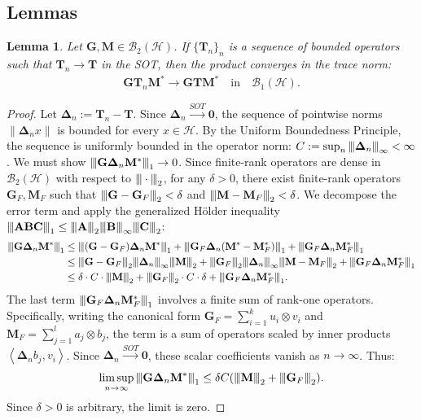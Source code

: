 \documentclass[noinfoline]{imsart}\setcounter{tocdepth}{2}
\newcommand{\m}[1]{\mathbf{#1}}
\renewcommand{\c}[1]{\mathcal{#1}}
\newcommand{\innpr}[2]{{\left\langle {#1},{#2}\right\rangle}}
\newcommand{\vertiii}[1]{{\left\vert\kern-0.25ex\left\vert\kern-0.25ex\left\vert #1 
    \right\vert\kern-0.25ex\right\vert\kern-0.25ex\right\vert}} %
\newcommand{\vertii}[1]{{\vert\kern-0.25ex\vert\kern-0.25ex\vert #1 
    \vert\kern-0.25ex\vert\kern-0.25ex\vert}} %
\theoremstyle{plain}
\newtheorem{lemma}[theorem]{Lemma}
\begin{document}
\begin{appendix}
\section{Lemmas}

\begin{lemma}\label{lem:Holder:SOT}
Let $\m{G}, \m{M} \in \c{B}_{2}(\c{H})$. If $\{\m{T}_{n}\}_{n}$ is a sequence of bounded operators such that $\m{T}_{n} \to \m{T}$ in the SOT, then the product converges in the trace norm:
\begin{align*}
    \m{G} \m{T}_{n} \m{M}^{*} \to \m{G} \m{T} \m{M}^{*} \quad \text{in} \quad \c{B}_{1}(\c{H}).
\end{align*}
\end{lemma}
\begin{proof}
Let $\m{\Delta}_{n} := \m{T}_{n} - \m{T}$. Since $\m{\Delta}_{n} \xrightarrow{SOT} \m{0}$, the sequence of pointwise norms $\|\m{\Delta}_n x\|$ is bounded for every $x \in \c{H}$. By the Uniform Boundedness Principle, the sequence is uniformly bounded in the operator norm: $C := \sup_n \vertiii{\m{\Delta}_n}_{\infty} < \infty$.
We must show $\vertii{\m{G} \m{\Delta}_{n} \m{M}^{*}}_{1} \to 0$. Since finite-rank operators are dense in $\c{B}_2(\c{H})$ with respect to $\vertii{\cdot}_2$, for any $\delta > 0$, there exist finite-rank operators $\m{G}_F, \m{M}_F$ such that $\vertii{\m{G} - \m{G}_F}_{2} < \delta$ and $\vertii{\m{M} - \m{M}_F}_{2} < \delta$.
We decompose the error term and apply the generalized Hölder inequality $\vertii{\m{A}\m{B}\m{C}}_{1} \le \vertii{\m{A}}_{2} \vertiii{\m{B}}_{\infty} \vertii{\m{C}}_{2}$:
\begin{align*}
    \vertii{\m{G} \m{\Delta}_{n} \m{M}^{*}}_{1} &\le \vertii{(\m{G} - \m{G}_F) \m{\Delta}_{n} \m{M}^{*}}_{1} + \vertii{\m{G}_F \m{\Delta}_{n} (\m{M}^{*} - \m{M}_F^{*})}_{1} + \vertii{\m{G}_F \m{\Delta}_{n} \m{M}_F^{*}}_{1} \\
    &\le \vertii{\m{G} - \m{G}_F}_{2} \vertiii{\m{\Delta}_n}_{\infty} \vertii{\m{M}}_{2} + \vertii{\m{G}_F}_{2} \vertiii{\m{\Delta}_n}_{\infty} \vertii{\m{M} - \m{M}_F}_{2} + \vertii{\m{G}_F \m{\Delta}_{n} \m{M}_F^{*}}_{1} \\
    &\le \delta \cdot C \cdot \vertii{\m{M}}_{2} + \vertii{\m{G}_F}_{2} \cdot C \cdot \delta + \vertii{\m{G}_F \m{\Delta}_{n} \m{M}_F^{*}}_{1}.
\end{align*}
The last term $\vertii{\m{G}_F \m{\Delta}_{n} \m{M}_F^{*}}_{1}$ involves a finite sum of rank-one operators. Specifically, writing the canonical form $\m{G}_F = \sum_{i=1}^k u_i \otimes v_i$ and $\m{M}_F = \sum_{j=1}^l a_j \otimes b_j$, the term is a sum of operators scaled by inner products $\innpr{\m{\Delta}_n b_j}{v_i}$. Since $\m{\Delta}_n \xrightarrow{SOT} \m{0}$, these scalar coefficients vanish as $n \to \infty$. Thus:
\begin{align*}
    \limsup_{n \to \infty} \vertii{\m{G} \m{\Delta}_{n} \m{M}^{*}}_{1} \le \delta C (\vertii{\m{M}}_{2} + \vertii{\m{G}_F}_{2}).
\end{align*}
Since $\delta > 0$ is arbitrary, the limit is zero.
\end{proof}



\end{appendix}
\end{document}
